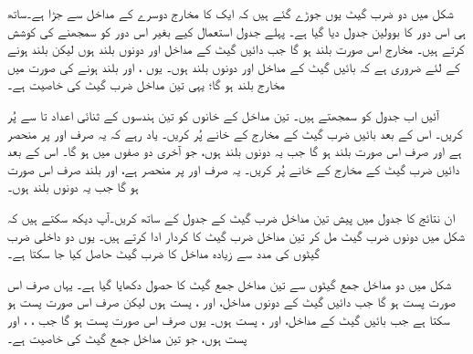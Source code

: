 شکل  میں دو  ضرب گیٹ   یوں جوڑے گئے ہیں کہ ایک کا مخارج دوسرے کے مداخل سے جڑا ہے۔ساتھ ہی اس دور کا بوولین جدول دیا گیا ہے۔ پہلے جدول استعمال کیے بغیر اس دور کو سمجھنے کی کوشش کرتے ہیں۔ مخارج   اس صورت  بلند ہو گا جب دائیں گیٹ کے   مداخل   اور  دونوں بلند ہوں لیکن  بلند ہونے کے لئے ضروری ہے کہ بائیں گیٹ کے مداخل   اور  دونوں بلند ہوں۔ یوں  ،  اور  بلند ہونے کی صورت میں مخارج  بلند ہو گا؛ یہی تین مداخل ضرب گیٹ کی خاصیت ہے۔


آئیں اب جدول کو  سمجھتے ہیں۔ تین مداخل  کے خانوں کو تین ہندسوں کے ثنائی اعداد   تا  سے  پُر کریں۔ اس کے بعد بائیں ضرب گیٹ کے مخارج   کے خانے پُر کریں۔ یاد رہے   کہ یہ صرف  اور  پر منحصر ہے اور صرف اس صورت بلند ہو گا جب یہ دونوں بلند ہوں، جو آخری دو صفوں میں ہو گا۔ اس کے بعد دائیں ضرب گیٹ کے مخارج  کے خانے پُر کریں۔ یہ صرف  اور  پر منحصر ہے، اور بلند صرف اس صورت ہو گا جب یہ دونوں بلند ہوں۔

ان نتائج کا جدول  میں پیش تین مداخل ضرب گیٹ کے  جدول کے ساتھ کریں۔آپ دیکھ سکتے ہیں کہ شکل  میں دونوں ضرب گیٹ مل کر  تین مداخل  ضرب گیٹ کا کردار ادا کرتے ہیں۔ یوں دو داخلی ضرب گیٹوں کی مدد سے زیادہ مداخل کا ضرب گیٹ حاصل کیا جا سکتا ہے۔

 شکل    میں دو  مداخل جمع  گیٹوں  سے  تین  مداخل  جمع گیٹ کا حصول دکھایا گیا ہے۔  یہاں  صرف اس صورت پست ہو گا جب دائیں گیٹ  کے دونوں مداخل،  اور ،  پست ہوں لیکن  صرف اس صورت پست ہو سکتا ہے جب بائیں گیٹ کے  مداخل،  اور ، پست ہوں۔ یوں  صرف اس صورت پست ہو گا جب ، ، اور  پست ہوں، جو تین  مداخل جمع گیٹ کی  خاصیت ہے۔

